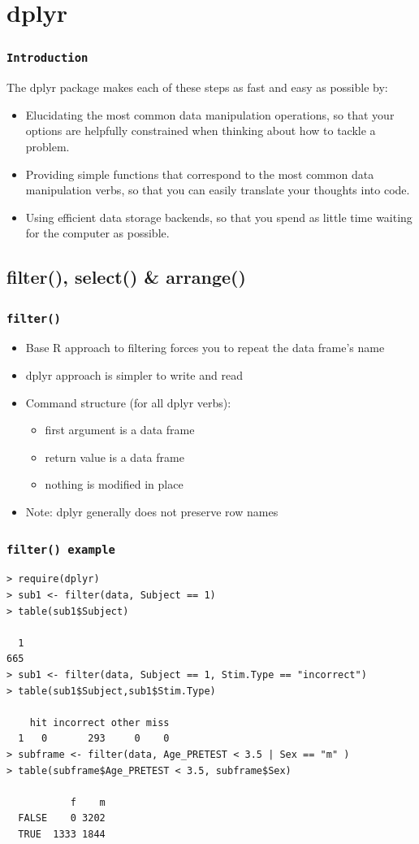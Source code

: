 \documentclass[xcolor={table},c]{beamer}
\begin{document}
\section{dplyr}
\begin{frame}\frametitle{\texttt{Introduction}}
The dplyr package makes each of these steps as fast and easy as possible by:
\begin{itemize}
\item  Elucidating the most common data manipulation operations, so that your options are helpfully constrained when thinking about how to tackle a problem.
\item  Providing simple functions that correspond to the most common data manipulation verbs, so that you can easily translate your thoughts into code.
\item Using efficient data storage backends, so that you spend as little time waiting for the computer as possible.
\end{itemize}
\end{frame}

\subsection{filter(), select() \& arrange()}
\begin{frame}[fragile]\frametitle{\texttt{filter()}}
  \begin{itemize}
  \item  Base R approach to filtering forces you to repeat the data frame’s name
  \item dplyr approach is simpler to write and read
  \item Command structure (for all dplyr verbs):
    \begin{itemize}
    \item first argument is a data frame
    \item return value is a data frame
    \item nothing is modified in place
    \end{itemize}
  \item Note: dplyr generally does not preserve row names
  \end{itemize}
\end{frame}


\begin{frame}[fragile]\frametitle{\texttt{filter() example}}\footnotesize
\begin{verbatim}
> require(dplyr)
> sub1 <- filter(data, Subject == 1)
> table(sub1$Subject)

  1 
665   
> sub1 <- filter(data, Subject == 1, Stim.Type == "incorrect")
> table(sub1$Subject,sub1$Stim.Type)
   
    hit incorrect other miss
  1   0       293     0    0
> subframe <- filter(data, Age_PRETEST < 3.5 | Sex == "m" )
> table(subframe$Age_PRETEST < 3.5, subframe$Sex)
       
           f    m
  FALSE    0 3202
  TRUE  1333 1844
\end{verbatim}
\end{frame}
\end{document}

